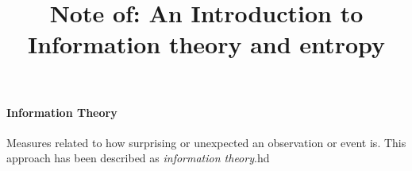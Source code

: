 \documentclass[10 pt,final]{article}
\title{Note of: An Introduction to Information theory and entropy}
\begin{document}
\date{}

\maketitle

\paragraph{Information Theory} Measures related to how surprising or unexpected an observation or event is. This approach has been described as \emph{information theory}.hd

\end{document}
